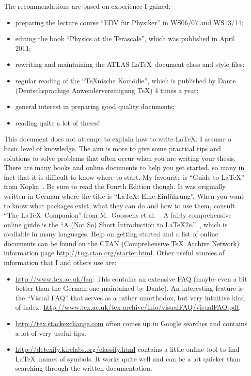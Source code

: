 The recommendations are based on experience I gained:
\begin{itemize}
\item  preparing the
lecture course \foreignquote{ngerman}{EDV für Physiker} in WS06/07 and WS13/14;
\item editing the book \enquote{Physics at the Terascale}, which was
  published in April 2011;
\item rewriting and maintaining the ATLAS \LaTeX\ document class and style files;
\item regular reading of the \foreignquote{ngerman}{TeXnische Komödie},
  which is published by \foreignlanguage{ngerman}{Dante
    (Deutschsprachige Anwendervereinigung \TeX)} 4 times a year;
\item general interest in preparing good quality documents;
\item reading quite a lot of theses!
\end{itemize}

This document does not attempt to explain how to write \LaTeX. I
assume a basic level of knowledge. The aim is more to give some
practical tips and solutions to solve problems that often occur when
you are writing your thesis. There are many books and online documents
to help you get started, so many in fact that it is difficult to know
where to start. My favourite is \enquote{Guide to \LaTeX} from
Kopka~\cite{kopka04}. Be sure to read the Fourth Edition though. It
was originally written in German where the title is
\foreignquote{ngerman}{\LaTeX: Eine Einführung}. When you want to know
what packages exist, what they can do and how to use them, consult
\enquote{The \LaTeX\ Companion} from M.~Goossens et al.~\cite{goossens04}.
A fairly comprehensive online guide is the
\enquote{A (Not So) Short Introduction to LaTeX2e.}~\cite{lshort},
which is available in many languages.
Help on getting started and a list of online
documents can be found on the CTAN (Comprehensive \TeX\ Archive
Network) information page
\url{http://tug.ctan.org/starter.html}. Other useful sources of
information that I and others use are:
\begin{itemize}
\item \url{http://www.tex.ac.uk/faq}:
  This contains an extensive FAQ (maybe even a bit better than the German
  one maintained by Dante). An interesting feature is the \enquote{Visual FAQ}
  that serves as a rather unorthodox, but very intuitive kind of index:
  \url{http://www.tex.ac.uk/tex-archive/info/visualFAQ/visualFAQ.pdf}.
\item \url{http://tex.stackexchange.com} often comes up in Google
  searches and contains a lot of very useful tips.
\item \url{http://detexify.kirelabs.org/classify.html} contains a
  little online tool to find \LaTeX\ names of symbols. It works quite
  well and can be a lot quicker than searching through the written
  documentation.
\end{itemize}

